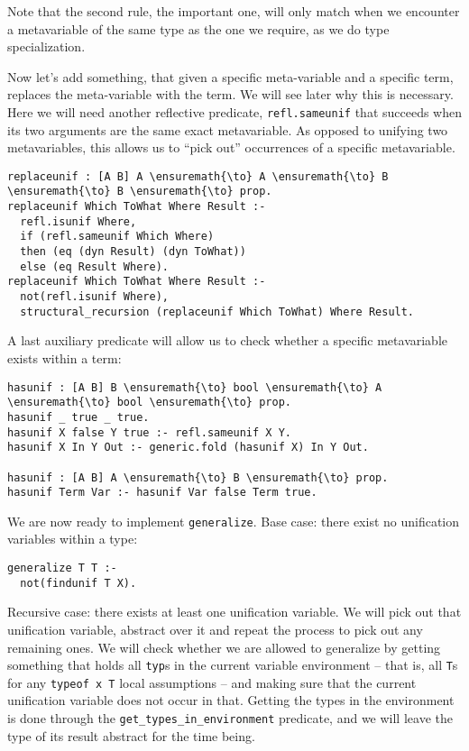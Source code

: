 Note that the second rule, the important one, will only match when we
encounter a metavariable of the same type as the one we require, as we
do type specialization.

Now let's add something, that given a specific meta-variable and a
specific term, replaces the meta-variable with the term. We will see
later why this is necessary. Here we will need another reflective
predicate, \texttt{refl.sameunif} that succeeds when its two arguments
are the same exact metavariable. As opposed to unifying two
metavariables, this allows us to ``pick out'' occurrences of a specific
metavariable.

\begin{verbatim}
replaceunif : [A B] A \ensuremath{\to} A \ensuremath{\to} B \ensuremath{\to} B \ensuremath{\to} prop.
replaceunif Which ToWhat Where Result :-
  refl.isunif Where,
  if (refl.sameunif Which Where)
  then (eq (dyn Result) (dyn ToWhat))
  else (eq Result Where).
replaceunif Which ToWhat Where Result :-
  not(refl.isunif Where),
  structural_recursion (replaceunif Which ToWhat) Where Result.
\end{verbatim}

A last auxiliary predicate will allow us to check whether a specific
metavariable exists within a term:

\begin{verbatim}
hasunif : [A B] B \ensuremath{\to} bool \ensuremath{\to} A \ensuremath{\to} bool \ensuremath{\to} prop.
hasunif _ true _ true.
hasunif X false Y true :- refl.sameunif X Y.
hasunif X In Y Out :- generic.fold (hasunif X) In Y Out.

hasunif : [A B] A \ensuremath{\to} B \ensuremath{\to} prop.
hasunif Term Var :- hasunif Var false Term true.
\end{verbatim}

We are now ready to implement \texttt{generalize}. Base case: there
exist no unification variables within a type:

\begin{verbatim}
generalize T T :- 
  not(findunif T X).
\end{verbatim}

Recursive case: there exists at least one unification variable. We will
pick out that unification variable, abstract over it and repeat the
process to pick out any remaining ones. We will check whether we are
allowed to generalize by getting something that holds all \texttt{typ}s
in the current variable environment -- that is, all \texttt{T}s for any
\texttt{typeof\ x\ T} local assumptions -- and making sure that the
current unification variable does not occur in that. Getting the types
in the environment is done through the
\texttt{get\_types\_in\_environment} predicate, and we will leave the
type of its result abstract for the time being.

